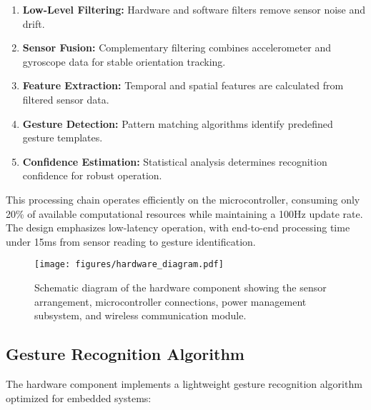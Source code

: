 \documentclass[arxiv,usenatbib]{iupartex}
\begin{document}
\begin{enumerate}
  \item \textbf{Low-Level Filtering:} Hardware and software filters remove sensor noise and drift.
  
  \item \textbf{Sensor Fusion:} Complementary filtering combines accelerometer and gyroscope data for stable orientation tracking.
  
  \item \textbf{Feature Extraction:} Temporal and spatial features are calculated from filtered sensor data.
  
  \item \textbf{Gesture Detection:} Pattern matching algorithms identify predefined gesture templates.
  
  \item \textbf{Confidence Estimation:} Statistical analysis determines recognition confidence for robust operation.
\end{enumerate}

This processing chain operates efficiently on the microcontroller, consuming only 20\% of available computational resources while maintaining a 100Hz update rate. The design emphasizes low-latency operation, with end-to-end processing time under 15ms from sensor reading to gesture identification.

\begin{figure}
    \begin{center}
        \label{fig2}
        \texttt{[image: figures/hardware\_diagram.pdf]}
        \caption{Schematic diagram of the hardware component showing the sensor arrangement, microcontroller connections, power management subsystem, and wireless communication module.} 
    \end{center}
\end{figure}

\subsection{Gesture Recognition Algorithm}
The hardware component implements a lightweight gesture recognition algorithm optimized for embedded systems:
\end{document}
